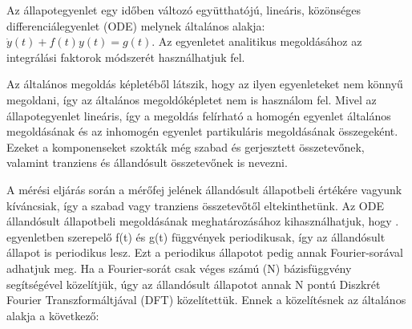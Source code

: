 
Az állapotegyenlet egy időben változó együtthatójú, lineáris, közönséges differenciálegyenlet (ODE) melynek általános alakja: $\dot{y}(t) + f(t)y(t) = g(t)$. Az egyenletet analitikus megoldásához az integrálási faktorok módszerét használhatjuk fel\cite{integrating_factor}.


Az általános megoldás képletéből látszik, hogy az ilyen egyenleteket nem könnyű megoldani, így az általános megoldóképletet nem is használom fel. Mivel az állapotegyenlet lineáris, így a megoldás felírható a homogén egyenlet általános megoldásának és az inhomogén egyenlet partikuláris megoldásának összegeként. Ezeket a komponenseket szokták még szabad és gerjesztett összetevőnek, valamint tranziens és állandósult összetevőnek is nevezni.


A mérési eljárás során a mérőfej jelének állandósult állapotbeli értékére vagyunk kíváncsiak, így a szabad vagy tranziens összetevőtől eltekinthetünk. Az ODE állandósult állapotbeli megoldásának meghatározásához kihasználhatjuk, hogy . egyenletben szerepelő f(t) és g(t) függvények periodikusak, így az állandósult állapot is periodikus lesz. Ezt a periodikus állapotot pedig annak Fourier-sorával adhatjuk meg. Ha a Fourier-sorát csak véges számú (N) bázisfüggvény segítségével közelítjük, úgy az állandósult állapotot annak N pontú Diszkrét Fourier Transzformáltjával (DFT) közelítettük. Ennek a közelítésnek az általános alakja a következő:


